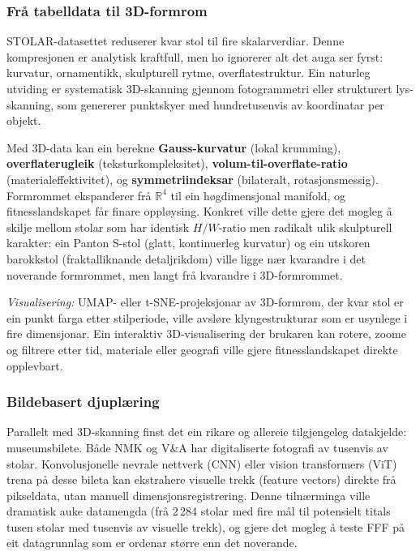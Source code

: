 \documentclass[10pt, a4paper, twocolumn]{article}
\begin{document}
\subsubsection{Frå tabelldata til 3D-formrom}

STOLAR-datasettet reduserer kvar stol til fire skalarverdiar. Denne kompresjonen er analytisk kraftfull, men ho ignorerer alt det auga ser fyrst: kurvatur, ornamentikk, skulpturell rytme, overflatestruktur. Ein naturleg utviding er systematisk 3D-skanning gjennom fotogrammetri eller strukturert lys-skanning, som genererer punktskyer med hundretusenvis av koordinatar per objekt.

Med 3D-data kan ein berekne \textbf{Gauss-kurvatur} (lokal krumming), \textbf{overflaterugleik} (teksturkompleksitet), \textbf{volum-til-overflate-ratio} (materialeffektivitet), og \textbf{symmetriindeksar} (bilateralt, rotasjonsmessig). Formrommet ekspanderer frå $\mathbb{R}^4$ til ein høgdimensjonal manifold, og fitnesslandskapet får finare oppløysing. Konkret ville dette gjere det mogleg å skilje mellom stolar som har identisk $H/W$-ratio men radikalt ulik skulpturell karakter: ein Panton S-stol (glatt, kontinuerleg kurvatur) og ein utskoren barokkstol (fraktalliknande detaljrikdom) ville ligge nær kvarandre i det noverande formrommet, men langt frå kvarandre i 3D-formrommet.

\textit{Visualisering:} UMAP- eller t-SNE-projeksjonar av 3D-formrom, der kvar stol er ein punkt farga etter stilperiode, ville avsløre klyngestrukturar som er usynlege i fire dimensjonar. Ein interaktiv 3D-visualisering der brukaren kan rotere, zoome og filtrere etter tid, materiale eller geografi ville gjere fitnesslandskapet direkte opplevbart.

\subsubsection{Bildebasert djuplæring}

Parallelt med 3D-skanning finst det ein rikare og allereie tilgjengeleg datakjelde: museumsbilete. Både NMK og V\&A har digitaliserte fotografi av tusenvis av stolar. Konvolusjonelle nevrale nettverk (CNN) eller vision transformers (ViT) trena på desse bileta kan ekstrahere visuelle trekk (feature vectors) direkte frå pikseldata, utan manuell dimensjonsregistrering. Denne tilnærminga ville dramatisk auke datamengda (frå 2\,284 stolar med fire mål til potensielt titals tusen stolar med tusenvis av visuelle trekk), og gjere det mogleg å teste FFF på eit datagrunnlag som er ordenar større enn det noverande.
\end{document}
